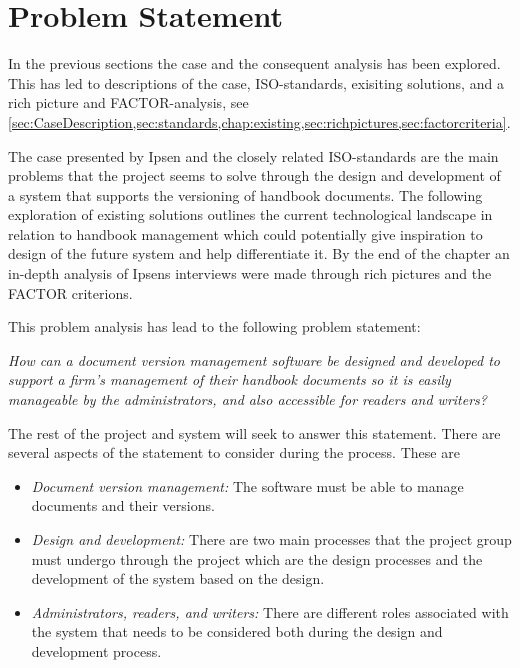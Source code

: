 \section{Problem Statement} \label{problemstatement}
In the previous sections the case and the consequent analysis has been explored.
This has led to descriptions of the case, ISO-standards, exisiting solutions, and a rich picture and FACTOR-analysis, see \cref{sec:CaseDescription,sec:standards,chap:existing,sec:richpictures,sec:factorcriteria}.

The case presented by Ipsen and the closely related ISO-standards are the main problems that the project seems to solve through the design and development of a system that supports the versioning of handbook documents. 
The following exploration of existing solutions outlines the current technological landscape in relation to handbook management which could potentially give inspiration to design of the future system and help differentiate it.
By the end of the chapter an in-depth analysis of Ipsens interviews were made through rich pictures and the FACTOR criterions.

This problem analysis has lead to the following problem statement:

\begin{center}
\textit{How can a document version management software be designed and developed to support a firm's management of their handbook documents so it is easily manageable by the administrators, and also accessible for readers and writers?}
\end{center}

The rest of the project and system will seek to answer this statement.
There are several aspects of the statement to consider during the process.
These are
\begin{itemize}
	\item \textit{Document version management:} The software must be able to manage documents and their versions.
	\item \textit{Design and development:} There are two main processes that the project group must undergo through the project which are the design processes and the development of the system based on the design.
	\item \textit{Administrators, readers, and writers:} There are different roles associated with the system that needs to be considered both during the design and development process.
\end{itemize}
